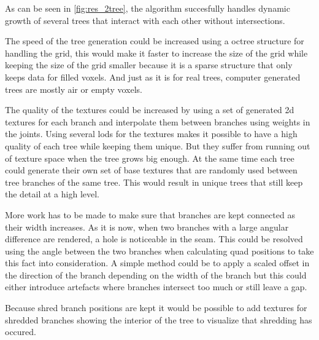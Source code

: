 \documentclass[11pt]{article} %
\begin{document}
As can be seen in \autoref{fig:res_2tree}, the algorithm succesfully handles dynamic growth of several trees that interact with each other without intersections.

The speed of the tree generation could be increased using a octree structure for handling the grid, this would make it faster to increase the size of the grid while keeping the size of the grid smaller because it is a sparse structure that only keeps data for filled voxels.
And just as it is for real trees, computer generated trees are mostly air or empty voxels.

The quality of the textures could be increased by using a set of generated 2d textures for each branch and interpolate them between branches using weights in the joints.
Using several lods for the textures makes it possible to have a high quality of each tree while keeping them unique.
But they suffer from running out of texture space when the tree grows big enough.
At the same time each tree could generate their own set of base textures that are randomly used between tree branches of the same tree.
This would result in unique trees that still keep the detail at a high level.

More work has to be made to make sure that branches are kept connected as their width increases.
As it is now, when two branches with a large angular difference are rendered, a hole is noticeable in the seam.
This could be resolved using the angle between the two branches when calculating quad positions to take this fact into consideration.
A simple method could be to apply a scaled offset in the direction of the branch depending on the width of the branch but this could either introduce artefacts where branches intersect too much or still leave a gap.

Because shred branch positions are kept it would be possible to add textures for shredded branches showing the interior of the tree to visualize that shredding has occured.



\end{document}

